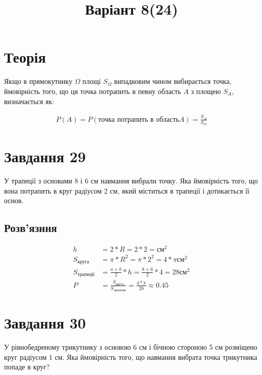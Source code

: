 \documentclass{article}
\begin{document}
\setmainfont{OpenSans}
\title{Варіант 8(24)}
\maketitle

\section*{Теорія}

Якщо в прямокутнику $\Omega$ площі $S_\Omega$ випадковим чином
вибирається точка, ймовірність того, що ця точка потрапить в певну
область $A$ з площею $S_A$, визначається як:

\begin{align*}
	P(A) = P(\text{точка потрапить в область} A) = \frac{S_A}{S_\Omega}
\end{align*}

\section{Завдання 29}

У трапеції з основами 8 і 6 см навмання вибрали точку.
Яка ймовірність того, що вона потрапить в круг радіусом 2 см,
який міститься в трапеції і дотикається її основ.

\subsection*{Розв'язння}

\begin{align*}
	h                 & = 2 * R = 2 * 2 = \text{см}^2                                                \\
	S_\text{круга}    & = \pi * R^2 = \pi * 2^2 = 4 * \pi \text{см}^2                                \\
	S_\text{трапеції} & = \frac{a + b}{2} * h = \frac{8 + 6}{2} * 4 = 28 \text{см}^2                 \\
	P                 & = \frac{S_\text{круга}}{S_\text{трапеції}} = \frac{4 * \pi}{28} \approx 0.45
\end{align*}

\section{Завдання 30}

У рівнобедреному трикутнику з основою 6 см і бічною стороною 5 см розміщено круг радіусом 1 см.
Яка ймовірність того, що навмання вибрата точка трикутника попаде в круг?
\end{document}
